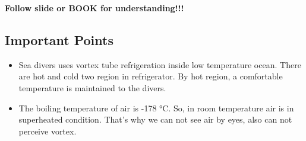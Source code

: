 \documentclass{article}
\begin{document}
\textbf{Follow slide or BOOK for understanding!!!} \\

\subsection*{Important Points}
\begin{itemize}
  \item Sea divers uses vortex tube refrigeration inside low temperature ocean. There are hot and cold two region in refrigerator. By hot region, a comfortable temperature is maintained to the divers. 
  \item The boiling temperature of air is -178 °C. So, in room temperature air is in superheated condition. That's why we can not see air by eyes, also can not perceive vortex. 
\end{itemize}
\end{document}
